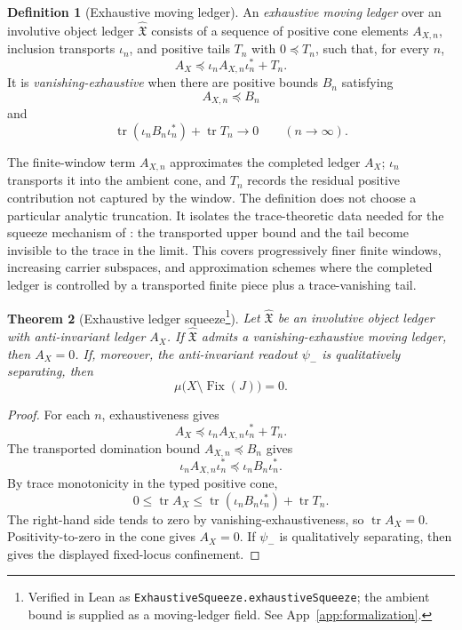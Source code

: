 \documentclass[11pt]{article}
\DeclareMathOperator{\Fix}{Fix}
\DeclareMathOperator{\trace}{tr}
\newcommand{\psim}{\psi_{-}}
\newcommand{\AX}{A_{X}}
\newcommand{\IOL}{\hat{\mathfrak{X}}}
\newtheorem{theorem}{Theorem}[section]
\theoremstyle{definition}
\newtheorem{definition}[theorem]{Definition}
\begin{document}
\begin{definition}[Exhaustive moving ledger]
\label{def:duality_confinement:exhaustive-moving-ledger}
An \emph{exhaustive moving ledger} over an involutive object ledger
\(\IOL\) consists of a sequence of positive cone elements
\(A_{X,n}\), inclusion transports \(\iota_n\), and positive tails
\(T_n\) with \(0\preceq T_n\), such that, for every \(n\),
\[
  \AX\preceq \iota_n A_{X,n}\iota_n^*+T_n.
\]
It is \emph{vanishing-exhaustive} when there are positive bounds
\(B_n\) satisfying
\[
  A_{X,n}\preceq B_n
\]
and
\[
  \trace(\iota_n B_n\iota_n^*)+\trace T_n\to0
  \qquad (n\to\infty).
\]
\end{definition}

The finite-window term \(A_{X,n}\) approximates the completed ledger
\(\AX\); \(\iota_n\) transports it into the ambient cone, and \(T_n\)
records the residual positive contribution not captured by the
window.  The definition does not choose a particular analytic
truncation.  It isolates the trace-theoretic data needed for the
squeeze mechanism of :
the transported upper bound and the tail become invisible to the
trace in the limit.  This covers progressively finer finite windows,
increasing carrier subspaces, and approximation schemes where the
completed ledger is controlled by a transported finite piece plus a
trace-vanishing tail.

\begin{theorem}[Exhaustive ledger squeeze\protect\footnote{Verified in Lean as \nolinkurl{ExhaustiveSqueeze.exhaustiveSqueeze}; the ambient bound is supplied as a moving-ledger field. See App~\ref{app:formalization}.}]
\label{thm:duality_confinement:exhaustive-squeeze}
Let \(\IOL\) be an involutive object ledger with anti-invariant
ledger \(\AX\).  If \(\IOL\) admits a vanishing-exhaustive moving
ledger, then \(\AX=0\).  If, moreover, the anti-invariant readout
\(\psim\) is qualitatively separating, then
\[
  \mu\bigl(X\setminus\Fix(J)\bigr)=0.
\]
\end{theorem}

\begin{proof}
For each \(n\), exhaustiveness gives
\[
  \AX\preceq \iota_n A_{X,n}\iota_n^*+T_n.
\]
The transported domination bound \(A_{X,n}\preceq B_n\) gives
\[
  \iota_n A_{X,n}\iota_n^*
  \preceq
  \iota_n B_n\iota_n^*.
\]
By trace monotonicity in the typed positive cone,
\[
  0\leq\trace\AX
  \leq
  \trace(\iota_n B_n\iota_n^*)+\trace T_n.
\]
The right-hand side tends to zero by vanishing-exhaustiveness, so
\(\trace\AX=0\).  Positivity-to-zero in the cone gives
\(\AX=0\).  If \(\psim\) is qualitatively separating, then
 gives the
displayed fixed-locus confinement.
\end{proof}
\end{document}
